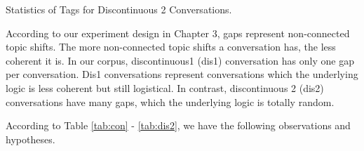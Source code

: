 \documentclass[bsc,frontabs,twoside,singlespacing,parskip,deptreport]{infthesis}     %
\begin{document}
\begin{minipage}{\textwidth}
\begin{minipage}[t]{0.45\textwidth}
        \end{minipage}
        \begin{minipage}[t]{0.45\textwidth}
        \centering
        \makeatletter{}\makeatother
{}
\caption{Statistics of Tags for Discontinuous 2  Conversations.}
\label{tab:dis2}

        \end{minipage}
    \end{minipage}



According to our experiment design in Chapter 3, gaps represent non-connected topic shifts. The more non-connected topic shifts a conversation has, the less coherent it is. In our corpus, discontinuous1 (dis1) conversation has only one gap per conversation. Dis1 conversations represent conversations which the underlying logic is less coherent but still logistical. In contrast, discontinuous 2 (dis2) conversations have many gaps, which the underlying logic is totally random.  

According to Table \ref{tab:con} - \ref{tab:dis2}, we have the following observations and hypotheses.
\end{document}
